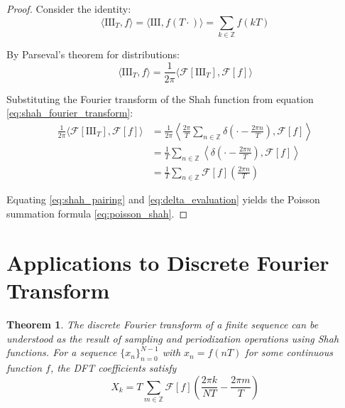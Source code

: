 \documentclass{article}
\newtheorem{theorem}{Theorem}
\begin{document}
\begin{proof}
Consider the identity:
\begin{equation}
\label{eq:shah_pairing}
\langle \text{III}_T, f \rangle = \langle \text{III}, f(T \cdot) \rangle = \sum_{k \in \mathbb{Z}} f(kT)
\end{equation}

By Parseval's theorem for distributions:
\begin{equation}
\label{eq:parseval_shah}
\langle \text{III}_T, f \rangle = \frac{1}{2\pi} \langle \mathcal{F}[\text{III}_T], \mathcal{F}[f] \rangle
\end{equation}

Substituting the Fourier transform of the Shah function from equation \eqref{eq:shah_fourier_transform}:
\begin{align}
\frac{1}{2\pi} \langle \mathcal{F}[\text{III}_T], \mathcal{F}[f] \rangle &= \frac{1}{2\pi} \left\langle \frac{2\pi}{T} \sum_{n \in \mathbb{Z}} \delta\left(\cdot - \frac{2\pi n}{T}\right), \mathcal{F}[f] \right\rangle \label{eq:substitute_shah_fourier_full}\\
&= \frac{1}{T} \sum_{n \in \mathbb{Z}} \left\langle \delta\left(\cdot - \frac{2\pi n}{T}\right), \mathcal{F}[f] \right\rangle \label{eq:factor_constants_poisson}\\
&= \frac{1}{T} \sum_{n \in \mathbb{Z}} \mathcal{F}[f]\left(\frac{2\pi n}{T}\right) \label{eq:delta_evaluation}
\end{align}

Equating \eqref{eq:shah_pairing} and \eqref{eq:delta_evaluation} yields the Poisson summation formula \eqref{eq:poisson_shah}.
\end{proof}

\section{Applications to Discrete Fourier Transform}

\begin{theorem}
\label{thm:dft_shah_connection}
The discrete Fourier transform of a finite sequence can be understood as the result of sampling and periodization operations using Shah functions. For a sequence $\{x_n\}_{n=0}^{N-1}$ with $x_n = f(nT)$ for some continuous function $f$, the DFT coefficients satisfy
\begin{equation}
\label{eq:dft_shah}
X_k = T \sum_{m \in \mathbb{Z}} \mathcal{F}[f]\left(\frac{2\pi k}{NT} - \frac{2\pi m}{T}\right)
\end{equation}
\end{theorem}
\end{document}
